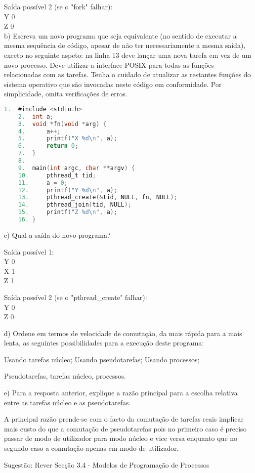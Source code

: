 \documentclass[11pt]{article}
\begin{document}
Saída possível 2 (se o "fork" falhar): \\
Y 0 \\
Z 0 \\

b) Escreva um novo programa que seja equivalente (no sentido de executar a mesma sequência de código, apesar de não ter necessariamente a mesma saída), exceto no seguinte aspeto: na linha 13 deve lançar uma nova tarefa em vez de um novo processo. Deve utilizar a interface POSIX para todas as funções relacionadas com as tarefas. Tenha o cuidado de atualizar as restantes funções do sistema operativo que são invocadas neste código em conformidade. Por simplicidade, omita verificações de erros.

\begin{lstlisting}[language=C]
    1.  #include <stdio.h>
    2.  int a;
    3.  void *fn(void *arg) {
    4.      a++;
    5.      printf("X %d\n", a);
    6.      return 0;
    7.  }
    8.
    9.  main(int argc, char **argv) {
    10.     pthread_t tid;
    11.     a = 0;
    12.     printf("Y %d\n", a);
    13.     pthread_create(&tid, NULL, fn, NULL);
    14.     pthread_join(tid, NULL);
    15.     printf("Z %d\n", a);
    16. }
\end{lstlisting}

c) Qual a saída do novo programa?

Saída possível 1: \\
Y 0 \\
X 1 \\
Z 1

Saída possível 2 (se o "pthread\_create" falhar): \\
Y 0 \\
Z 0

d) Ordene em termos de velocidade de comutação, da mais rápida para a mais lenta, as seguintes possibilidades para a execução deste programa:

Usando tarefas núcleo;
Usando pseudotarefas;
Usando processos;

Pseudotarefas, tarefas núcleo, processos.

e) Para a resposta anterior, explique a razão principal para a escolha relativa entre as tarefas núcleo e as pseudotarefas.

A principal razão prende-se com o facto da comutação de tarefas reais implicar mais custo do que a comutação de pseudotarefas pois no primeiro caso é preciso passar de modo de utilizador para modo núcleo e vice versa enquanto que no segundo caso a comutação apenas em modo de utilizador.

Sugestão: Rever Secção 3.4 - Modelos de Programação de Processos
\end{document}
